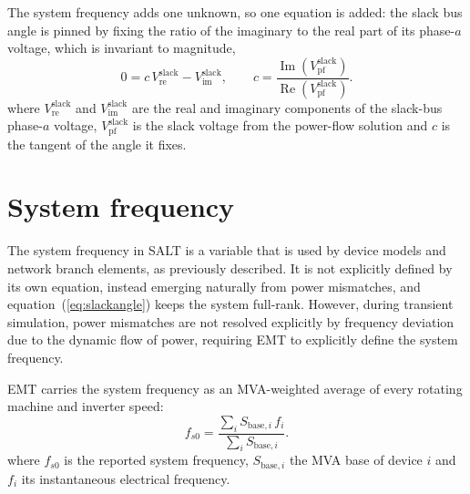 \documentclass[11pt]{article}
\begin{document}
The system frequency adds one unknown, so one equation is added: the slack
bus angle is pinned by fixing the ratio of the imaginary to the real part
of its phase-$a$ voltage, which is invariant to magnitude,
\begin{equation}
  0 = c\,V_{\text{re}}^{\text{slack}} - V_{\text{im}}^{\text{slack}},
  \qquad c = \frac{\operatorname{Im}(V^{\text{slack}}_{\text{pf}})}{\operatorname{Re}(V^{\text{slack}}_{\text{pf}})}.
  \label{eq:slackangle}
\end{equation}
where $V_{\text{re}}^{\text{slack}}$ and $V_{\text{im}}^{\text{slack}}$ are
the real and imaginary components of the slack-bus phase-$a$ voltage,
$V^{\text{slack}}_{\text{pf}}$ is the slack voltage from the power-flow
solution and $c$ is the tangent of the angle it fixes.

\section{System frequency}

The system frequency in SALT is a variable that is used by device models and
network branch elements, as previously described. It is not explicitly
defined by its own equation, instead emerging naturally from power
mismatches, and equation~(\ref{eq:slackangle}) keeps the system full-rank.
However, during transient simulation, power mismatches are not resolved
explicitly by frequency deviation due to the dynamic flow of power,
requiring EMT to explicitly define the system frequency.

EMT carries the system frequency as an MVA-weighted average of every
rotating machine and inverter speed:
\begin{equation}
  f_{s0} = \frac{\sum_i S_{\text{base},i}\,f_i}{\sum_i S_{\text{base},i}} .
\end{equation}
where $f_{s0}$ is the reported system frequency, $S_{\text{base},i}$ the
MVA base of device $i$ and $f_i$ its instantaneous electrical frequency.
\end{document}
